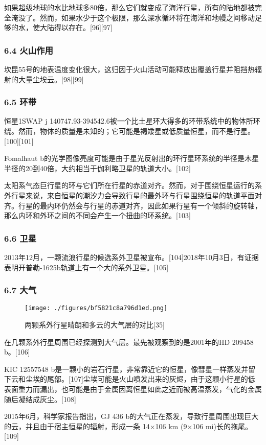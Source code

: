 如果超级地球的水比地球多80倍，那么它们就变成了海洋行星，所有的陆地都被完全淹没了。然而，如果水少于这个极限，那么深水循环将在海洋和地幔之间移动足够的水，使大陆得以存在。[96][97]
\subsubsection{6.4 火山作用}
坎昆55号的地表温度变化很大，这归因于火山活动可能释放出覆盖行星并阻挡热辐射的大量尘埃云。[98][99]
\subsubsection{6.5 环带}
恒星1SWAP j 140747.93-394542.6被一个比土星环大得多的环带系统中的物体所环绕。然而，物体的质量是未知的；它可能是褐矮星或低质量恒星，而不是行星。[100][101]

Fomalhaut b的光学图像亮度可能是由于星光反射出的环行星环系统的半径是木星半径的20到40倍，大约相当于伽利略卫星的轨道大小。[102]

太阳系气态巨行星的环与它们所在行星的赤道对齐。然而，对于围绕恒星运行的系外行星来说，来自恒星的潮汐力会导致行星的最外环与行星围绕恒星的轨道平面对齐。行星的最内环仍然会与行星的赤道对齐，因此如果行星有一个倾斜的旋转轴，那么内环和外环之间的不同会产生一个扭曲的环系统。[103]
\subsubsection{6.6 卫星}
2013年12月，一颗流浪行星的候选系外卫星被宣布。[104]2018年10月3日，有证据表明开普勒-1625b轨道上有一个大的系外卫星。[105]
\subsubsection{6.7 大气}
\begin{figure}[ht]
\centering
\texttt{[image: ./figures/bf5821c8a796d1ed.png]}
\caption{两颗系外行星晴朗和多云的大气层的对比[35]} \label{fig_TYXWXX_12}
\end{figure}
在几颗系外行星周围已经探测到大气层。最先被观察到的是2001年的HD 209458 b。[106]

KIC 12557548 b是一颗小的岩石行星，非常靠近它的恒星，像彗星一样蒸发并留下云和尘埃的尾部。[107]尘埃可能是火山喷发出来的灰烬，由于这颗小行星的低表面重力而漏出，也可能是由于金属因离恒星如此之近而被高温蒸发，气化的金属随后凝结成灰尘。[108]

2015年6月，科学家报告指出，GJ 436 b的大气正在蒸发，导致行星周围出现巨大的云，并且由于宿主恒星的辐射，形成一条 14×106 km (9×106 mi)长的拖尾。[109]

